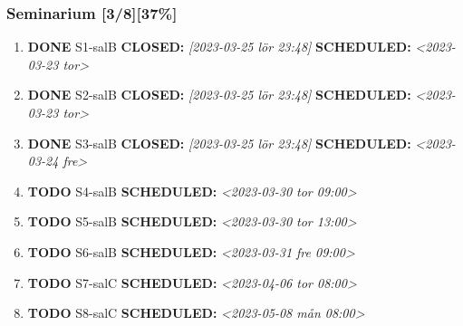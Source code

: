 \documentclass[11pt]{article}
\begin{document}
\subsubsection{Seminarium [3/8][37\%]}
\label{sec:orga2335e5}
\begin{enumerate}
\item {\bfseries\sffamily DONE} S1-salB
\label{sec:org5f72fc0}
\noindent\textbf{CLOSED:} \textit{[2023-03-25 lör 23:48] } \textbf{SCHEDULED:} \textit{<2023-03-23 tor>}\\[0pt]
\item {\bfseries\sffamily DONE} S2-salB
\label{sec:orga25cfe8}
\noindent\textbf{CLOSED:} \textit{[2023-03-25 lör 23:48] } \textbf{SCHEDULED:} \textit{<2023-03-23 tor>}\\[0pt]
\item {\bfseries\sffamily DONE} S3-salB
\label{sec:orge33033b}
\noindent\textbf{CLOSED:} \textit{[2023-03-25 lör 23:48] } \textbf{SCHEDULED:} \textit{<2023-03-24 fre>}\\[0pt]
\item {\bfseries\sffamily TODO} S4-salB
\label{sec:orgdd56bf5}
\noindent\textbf{SCHEDULED:} \textit{<2023-03-30 tor 09:00>}\\[0pt]
\item {\bfseries\sffamily TODO} S5-salB
\label{sec:org27b7375}
\noindent\textbf{SCHEDULED:} \textit{<2023-03-30 tor 13:00>}\\[0pt]
\item {\bfseries\sffamily TODO} S6-salB
\label{sec:org0845787}
\noindent\textbf{SCHEDULED:} \textit{<2023-03-31 fre 09:00>}\\[0pt]
\item {\bfseries\sffamily TODO} S7-salC
\label{sec:org31b832e}
\noindent\textbf{SCHEDULED:} \textit{<2023-04-06 tor 08:00>}\\[0pt]
\item {\bfseries\sffamily TODO} S8-salC
\label{sec:org736855a}
\noindent\textbf{SCHEDULED:} \textit{<2023-05-08 mån 08:00>}\\[0pt]
\end{enumerate}
\end{document}
